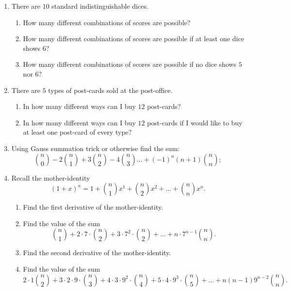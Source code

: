 \documentclass[12pt]{article}
\begin{document}
\begin{enumerate}
    \item There are $10$ standard indistinguishable dices. 

\begin{enumerate}[label=\alph*)]
    \item How many different combinations of scores are possible?
    \item How many different combinations of scores are possible if at least one dice shows $6$?
    \item How many different combinations of scores are possible if no dice shows $5$ nor $6$?
\end{enumerate}

\item There are $5$ types of post-cards sold at the post-office. 
\begin{enumerate}[label=\alph*)]
\item In how many different ways can I buy $12$ post-cards?
\item In how many different ways can I buy $12$ post-cards if I would like to buy at least one post-card of every type?
\end{enumerate}

\item Using Gauss summation trick or otherwise find the sum:
\[
{n \choose 0} - 2 {n \choose 1} + 3 {n \choose 2} - 4 {n \choose 3} \dots + (-1)^n (n+1){n \choose n};
\]

\item Recall the mother-identity
\[
(1 + x)^n = 1 + {n \choose 1} x^1 + {n \choose 2} x^2 + \dots + {n \choose n} x^n.
\]

\begin{enumerate}
    \item Find the first derivative of the mother-identity. 
    \item Find the value of the sum
\[
{n \choose 1} + 2 \cdot 7 \cdot {n \choose 2} + 3 \cdot 7^2 \cdot {n \choose 2} + \dots + n \cdot 7^{n-1} {n \choose n}.
\]
\item Find the second derivative of the mother-identity.
\item Find the value of the sum
\[
2 \cdot 1 {n \choose 2} + 3 \cdot 2 \cdot 9 \cdot {n \choose 3} + 4 \cdot 3 \cdot 9^2 \cdot {n \choose 4} + 5 \cdot 4 \cdot 9^3 \cdot {n \choose 5} + \dots + n(n-1) 9^{n-2} {n \choose n}.
\]

\end{enumerate}

\end{enumerate}
\end{document}
